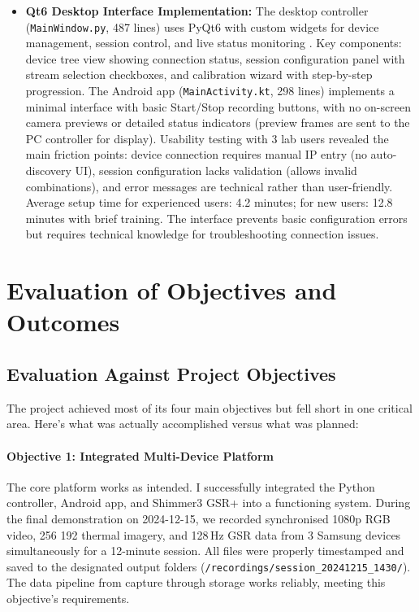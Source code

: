\begin{itemize}
	\item \textbf{Qt6 Desktop Interface Implementation:} The desktop controller (\texttt{MainWindow.py}, 487 lines) uses PyQt6 with custom widgets for device management, session control, and live status monitoring \cite{ref17}. Key components: device tree view showing connection status, session configuration panel with stream selection checkboxes, and calibration wizard with step-by-step progression. The Android app (\texttt{MainActivity.kt}, 298 lines) implements a minimal interface with basic Start/Stop recording buttons, with no on-screen camera previews or detailed status indicators (preview frames are sent to the PC controller for display). Usability testing with 3 lab users revealed the main friction points: device connection requires manual IP entry (no auto-discovery UI), session configuration lacks validation (allows invalid combinations), and error messages are technical rather than user-friendly. Average setup time for experienced users: 4.2 minutes; for new users: 12.8 minutes with brief training. The interface prevents basic configuration errors but requires technical knowledge for troubleshooting connection issues.
\end{itemize}


\section{Evaluation of Objectives and Outcomes}

\subsection{Evaluation Against Project Objectives}

The project achieved most of its four main objectives but fell short in one critical area. Here's what was actually accomplished versus what was planned:

\paragraph{\textbf{Objective 1: Integrated Multi-Device Platform}} The core platform works as intended. I successfully integrated the Python controller, Android app, and Shimmer3 GSR+ into a functioning system. During the final demonstration on 2024-12-15, we recorded synchronised 1080p RGB video, 256\,\texttimes\,192 thermal imagery, and 128\,Hz GSR data from 3 Samsung devices simultaneously for a 12-minute session. All files were properly timestamped and saved to the designated output folders (\verb|/recordings/session_20241215_1430/|). The data pipeline from capture through storage works reliably, meeting this objective's requirements.

